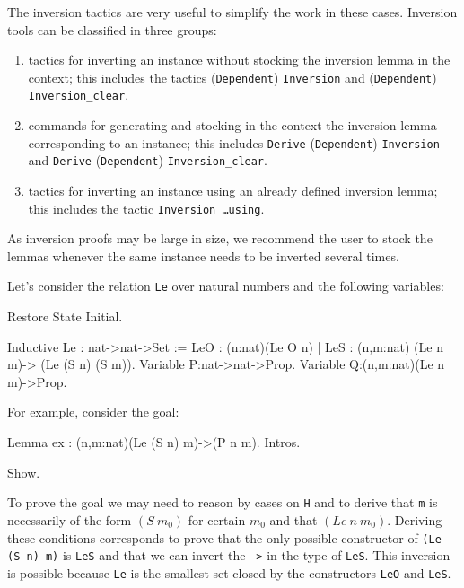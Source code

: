 \begin{coq_example*}
The inversion tactics are very useful to simplify the work in these
cases. Inversion tools can be classified in three groups:

\begin{enumerate}
\item tactics for inverting an instance without stocking the inversion
  lemma in the context; this includes the tactics
  (\texttt{Dependent})  \texttt{Inversion} and
 (\texttt{Dependent}) \texttt{Inversion\_clear}.
\item commands for generating and stocking in the context the inversion
  lemma corresponding to an instance; this includes \texttt{Derive}
  (\texttt{Dependent}) \texttt{Inversion} and \texttt{Derive}
  (\texttt{Dependent}) \texttt{Inversion\_clear}.
\item tactics for inverting an instance using an already defined
  inversion lemma; this includes the tactic \texttt{Inversion \ldots using}.
\end{enumerate}

As inversion proofs may be large in size, we recommend the user to
stock the lemmas whenever the same instance needs to be inverted
several times.

\firstexample
{}

Let's consider the relation \texttt{Le} over natural numbers and the
following variables:

\begin{coq_eval}
Restore State Initial.
\end{coq_eval}

\begin{coq_example*}
Inductive Le : nat->nat->Set :=
  LeO : (n:nat)(Le O n)  |  LeS : (n,m:nat) (Le n m)-> (Le (S n) (S m)).
Variable P:nat->nat->Prop.
Variable Q:(n,m:nat)(Le n m)->Prop.
\end{coq_example*}

For example, consider the goal:

\begin{coq_eval}
Lemma ex : (n,m:nat)(Le (S n) m)->(P n m).
Intros.
\end{coq_eval}

\begin{coq_example}
Show.
\end{coq_example}

To prove the goal we may need to reason by cases on \texttt{H} and to 
 derive that \texttt{m}  is necessarily of
the form $(S~m_0)$ for certain $m_0$ and that $(Le~n~m_0)$.  
Deriving these conditions corresponds to prove that the
only possible constructor of \texttt{(Le (S n) m)}  is
\texttt{LeS} and that we can invert the 
\texttt{->} in the type  of \texttt{LeS}.  
This inversion is possible because \texttt{Le} is the smallest set closed by
the constructors \texttt{LeO} and \texttt{LeS}.


\end{coq_example*}
